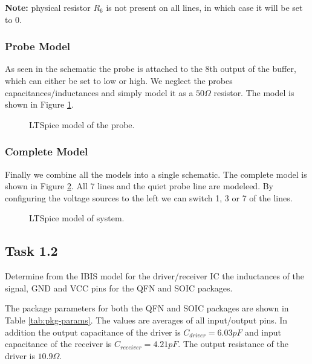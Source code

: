 \documentclass[../main.tex]{subfiles}
\begin{document}
\textbf{Note:} physical resistor $R_6$ is not present on all lines, in which case it will be set to 0.

\subsubsection{Probe Model}

As seen in the schematic the probe is attached to the 8th output of the buffer, which can either be set to low or high. We neglect the probes capacitances/inductances and simply model it as a $50\si{\Omega}$ resistor. The model is shown in Figure \ref{fig:probe}.

\begin{figure}[h]
    \centering
    \caption{LTSpice model of the probe.}
    \label{fig:probe}
\end{figure}

\subsubsection{Complete Model}

Finally we combine all the models into a single schematic. The complete model is shown in Figure \ref{fig:complete}. All 7 lines and the quiet probe line are modeleed. By configuring the voltage sources to the left we can switch 1, 3 or 7 of the lines. 

\newpage

\begin{figure}[h]
    \centering
    \caption{LTSpice model of system.}
    \label{fig:complete}
\end{figure}

\subsection{Task 1.2}

Determine from the IBIS model for the driver/receiver IC the inductances of the signal, GND and VCC pins for the QFN and SOIC packages.

\solution

The package parameters for both the QFN and SOIC packages are shown in Table \ref{tab:pkg-params}. The values are averages of all input/output pins. In addition the output capacitance of the driver is $C_{driver} = 6.03 \si{pF}$ and input capacitance of the receiver is $C_{receiver} = 4.21 \si{pF}$. The output resistance of the driver is $10.9\si{\Omega}$.
\end{document}
